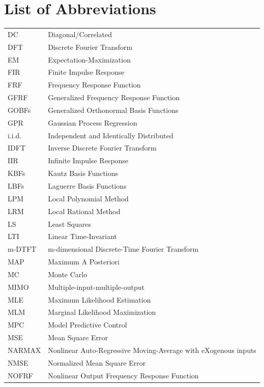 \documentclass[11pt,twoside]{report}
\begin{document}
\chapter*{List of Abbreviations}
\thispagestyle{plain}
\begin{longtable}{p{} p{}}
\\
DC & Diagonal/Correlated \\
DFT & Discrete Fourier Transform \\
EM & Expectation-Maximization \\
FIR & Finite Impulse Response \\
FRF & Frequency Response Function \\
GFRF & Generalized Frequency Response Function \\
GOBFs & Generalized Orthonormal Basis Functions \\
GPR & Gaussian Process Regression \\
i.i.d. & Independent and Identically Distributed \\
IDFT & Inverse Discrete Fourier Transform \\
IIR & Infinite Impulse Response \\
KBFs & Kautz Basis Functions \\
LBFs & Laguerre Basis Functions \\
LPM & Local Polynomial Method \\
LRM & Local Rational Method \\
LS & Least Squares \\
LTI & Linear Time-Invariant \\
m-DTFT & m-dimensional Discrete-Time Fourier Transform \\
MAP & Maximum A Posteriori \\
MC & Monte Carlo \\
MIMO & Multiple-input-multiple-output \\
MLE & Maximum Likelihood Estimation \\
MLM & Marginal Likelihood Maximization \\
MPC & Model Predictive Control \\
MSE & Mean Square Error \\
NARMAX & Nonlinear Auto-Regressive Moving-Average with eXogenous inputs \\
NMSE & Normalized Mean Square Error \\
NOFRF & Nonlinear Output Frequency Response Function \\

\end{longtable}
\end{document}
